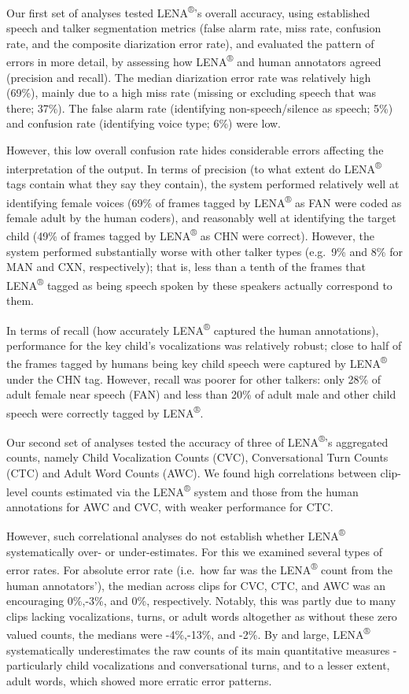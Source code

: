\documentclass[english,floatsintext,man]{apa6}
\begin{document}
Our first set of analyses tested LENA\textsuperscript{®}'s overall
accuracy, using established speech and talker segmentation metrics
(false alarm rate, miss rate, confusion rate, and the composite
diarization error rate), and evaluated the pattern of errors in more
detail, by assessing how LENA\textsuperscript{®} and human annotators
agreed (precision and recall). The median diarization error rate was
relatively high (69\%), mainly due to a high miss rate (missing or
excluding speech that was there; 37\%). The false alarm rate
(identifying non-speech/silence as speech; 5\%) and confusion rate
(identifying voice type; 6\%) were low.

However, this low overall confusion rate hides considerable errors
affecting the interpretation of the output. In terms of precision (to
what extent do LENA\textsuperscript{®} tags contain what they say they
contain), the system performed relatively well at identifying female
voices (69\% of frames tagged by LENA\textsuperscript{®} as FAN were
coded as female adult by the human coders), and reasonably well at
identifying the target child (49\% of frames tagged by
LENA\textsuperscript{®} as CHN were correct). However, the system
performed substantially worse with other talker types (e.g.~9\% and 8\%
for MAN and CXN, respectively); that is, less than a tenth of the frames
that LENA\textsuperscript{®} tagged as being speech spoken by these
speakers actually correspond to them.

In terms of recall (how accurately LENA\textsuperscript{®} captured the
human annotations), performance for the key child's vocalizations was
relatively robust; close to half of the frames tagged by humans being
key child speech were captured by LENA\textsuperscript{®} under the CHN
tag. However, recall was poorer for other talkers: only 28\% of adult
female near speech (FAN) and less than 20\% of adult male and other
child speech were correctly tagged by LENA\textsuperscript{®}.

Our second set of analyses tested the accuracy of three of
LENA\textsuperscript{®}'s aggregated counts, namely Child Vocalization
Counts (CVC), Conversational Turn Counts (CTC) and Adult Word Counts
(AWC). We found high correlations between clip-level counts estimated
via the LENA\textsuperscript{®} system and those from the human
annotations for AWC and CVC, with weaker performance for CTC.

However, such correlational analyses do not establish whether
LENA\textsuperscript{®} systematically over- or under-estimates. For
this we examined several types of error rates. For absolute error rate
(i.e.~how far was the LENA\textsuperscript{®} count from the human
annotators'), the median across clips for CVC, CTC, and AWC was an
encouraging 0\%,-3\%, and 0\%, respectively. Notably, this was partly
due to many clips lacking vocalizations, turns, or adult words
altogether as without these zero valued counts, the medians were
-4\%,-13\%, and -2\%. By and large, LENA\textsuperscript{®}
systematically underestimates the raw counts of its main quantitative
measures - particularly child vocalizations and conversational turns,
and to a lesser extent, adult words, which showed more erratic error
patterns.
\end{document}
